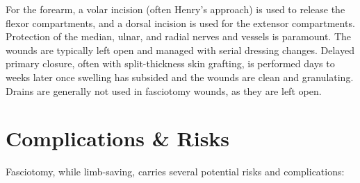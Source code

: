 For the forearm, a volar incision (often Henry's approach) is used to release the flexor compartments, and a dorsal incision is used for the extensor compartments. Protection of the median, ulnar, and radial nerves and vessels is paramount. The wounds are typically left open and managed with serial dressing changes. Delayed primary closure, often with split-thickness skin grafting, is performed days to weeks later once swelling has subsided and the wounds are clean and granulating. Drains are generally not used in fasciotomy wounds, as they are left open.

\section*{Complications \& Risks}
Fasciotomy, while limb-saving, carries several potential risks and complications:

